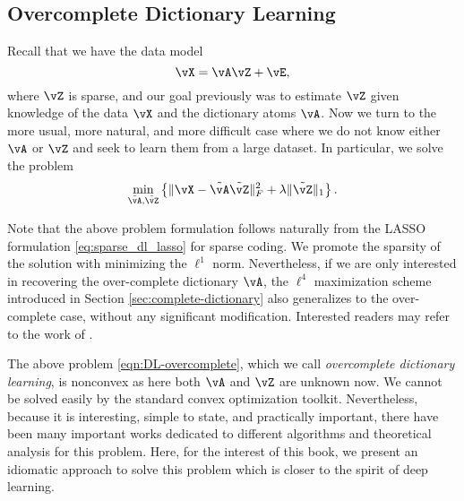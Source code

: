 \documentclass[../../book-main.tex]{subfiles}
\begin{document}
\subsection{Overcomplete Dictionary Learning} 

Recall that we have the data model 
\begin{equation}
    \vX = \vA\vZ + \vE,
\end{equation}
where \(\vZ\) is sparse, and our goal previously was to estimate \(\vZ\) given knowledge of the data \(\vX\) and the dictionary atoms \(\vA\). Now we turn to the more usual, more natural, and more difficult case where we do not know either \(\vA\) or \(\vZ\) and seek to learn them from a large dataset. In particular, we solve the problem
\begin{equation}
    \min_{\tilde{\vA}, \tilde{\vZ}}\bc{\norm{\vX - \tilde{\vA}\tilde{\vZ}}_{F}^{2} + \lambda \norm{\tilde{\vZ}}_{1}}.
    \label{eqn:DL-overcomplete}
\end{equation}
\begin{remark}
Note that the above problem formulation follows naturally from the LASSO formulation \eqref{eq:sparse_dl_lasso} for sparse coding. We promote the sparsity of the solution with minimizing the \(\ell^1\) norm. Nevertheless, if we are only interested in recovering the over-complete dictionary \(\vA\), the \(\ell^4\) maximization scheme introduced in Section \ref{sec:complete-dictionary} also generalizes to the over-complete case, without any significant modification. Interested readers may refer to the work of \cite{Qu2020Geometric}. 
\end{remark}

The above problem \eqref{eqn:DL-overcomplete}, which we call \textit{overcomplete dictionary learning}, is nonconvex as here both \(\vA\) and \(\vZ\) are unknown now. We cannot be solved easily by the standard convex optimization toolkit. Nevertheless, because it is interesting, simple to state, and practically important, there have been many important works dedicated to different algorithms and theoretical analysis for this problem. Here, for the interest of this book, we present an idiomatic approach to solve this problem which is closer to the spirit of deep learning.
\end{document}
